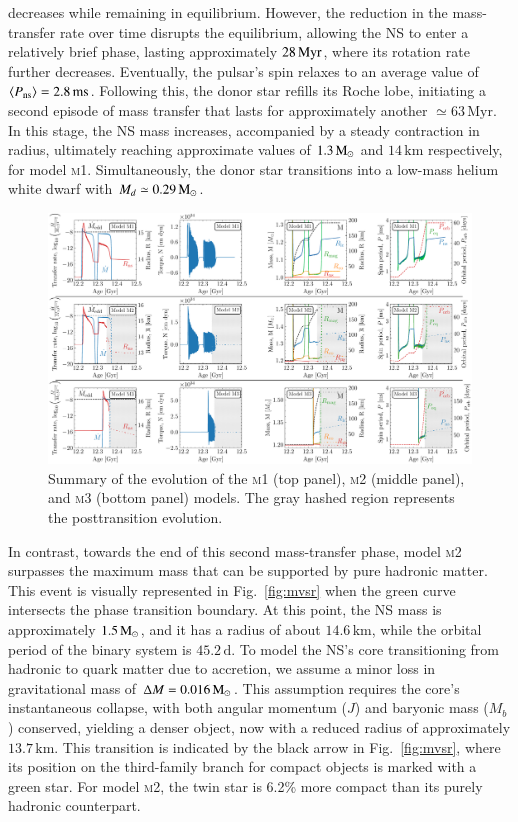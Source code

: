 \documentclass[main.tex]{subfiles}
\begin{document}
    decreases while remaining in equilibrium. However, the reduction in the mass-transfer rate over time disrupts the equilibrium, allowing the NS to enter a relatively brief phase, lasting 
    approximately $28\,\rm{Myr}$, where its rotation rate further decreases. Eventually, the pulsar's spin relaxes to an average value of $\langle P_{\rm ns} \rangle = 2.8\,\rm{ms}$. Following this, the donor star refills its Roche lobe, initiating a second episode of mass transfer that lasts for approximately another $\simeq 63\,\text{Myr}$. In this stage, the NS mass increases, accompanied by a steady contraction in radius, ultimately reaching approximate values of $1.3\mathrm{\,M_\odot}$ and 
    $14\,\text{km}$ respectively, for model \textsc{m1}. Simultaneously, the donor star transitions into a low-mass helium white dwarf with $M_d \simeq 0.29\mathrm{\,M_\odot}$.

    \begin{figure}[th]
        \centering
        \includegraphics[width=\columnwidth,angle=0]{figures/chapter4/lmxb_grid.pdf}
        \caption{Summary of the evolution of the \textsc{m1} (top panel), \textsc{m2} (middle panel), and \textsc{m3} (bottom panel) models. The gray hashed region represents the posttransition evolution.}
        \label{fig:lmxb_grid}
    \end{figure}   
    
    In contrast, towards the end of this second mass-transfer phase, model \textsc{m2} surpasses the maximum mass that can be supported by pure hadronic matter. This event is visually represented in Fig.~\ref{fig:mvsr} when the green curve intersects the phase transition boundary. At this point, the NS mass is approximately $1.5\mathrm{\,M_\odot}$, and it has a radius of about $14.6\,\mathrm{km}$, while the orbital period of the binary system is $45.2\,\mathrm{d}$. To model the NS's core transitioning from hadronic to quark matter due to accretion, we assume a minor loss in gravitational mass of $\Delta M = 0.016\mathrm{\,M_\odot}$. This assumption requires the core's instantaneous collapse, with both angular momentum ($J$) and baryonic mass ($M_b$) conserved, yielding a denser object, now with a reduced radius of approximately $13.7\,\mathrm{km}$. This transition is indicated by the black arrow in Fig.~\ref{fig:mvsr}, where its position on the third-family branch for compact objects is marked with a green star. For model \textsc{m2}, the twin star is 6.2\% more compact than its purely hadronic counterpart.
    
\end{document}
